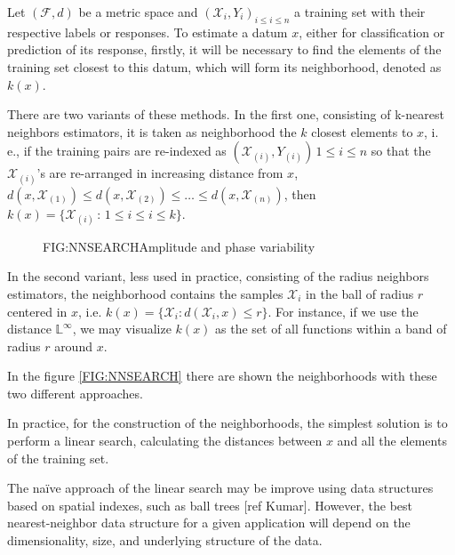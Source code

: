 
Let $(\mathcal{F}, d)$ be a metric space and
$(\mathcal{X}_i, {Y}_i)_{i \le i \le n}$ a training set with their
respective labels or responses.
To estimate a datum $x$, either for classification or prediction of its
response, firstly, it will be necessary to find the elements of the training set
closest to this datum, which will form its neighborhood, denoted as $k(x)$.

There are two variants of these methods. In the first one, consisting of
k-nearest neighbors estimators, it is taken as neighborhood the $k$ closest
elements to $x$, i. e., if the training pairs are re-indexed as
$(\mathcal{X}_{(i)}, Y_{(i)}) \, 1\le i\le n$ so that the
$\mathcal{X}_{(i)}$'s are re-arranged in increasing distance from $x$,
$d(x, \mathcal{X}_{(1)}) \le d(x, \mathcal{X}_{(2)}) \le \dots \le d(x, \mathcal{X}_{(n)})$,
 then $k(x) = \{\mathcal{X}_{(i)} \, : \, 1 \le i \le i\le k\}$.

\begin{figure}[neighborhoods using the distance $\mathbb{L}^\infty$]{FIG:NNSEARCH}{Amplitude and phase variability}
	 \quad
\end{figure}

In the second variant, less used in practice, consisting of the radius neighbors
estimators, the neighborhood contains the samples $\mathcal{X}_i$ in the ball of
radius $r$ centered in $x$, i.e.
$k(x) = \{ \mathcal{X}_i : d(\mathcal{X}_i , x) \le r\}$. For instance, if we
use the distance $\mathbb{L}^\infty$, we may visualize $k(x)$ as the set of all
functions within a band  of radius $r$ around $x$.

In the figure \ref{FIG:NNSEARCH} there are shown the neighborhoods with these two different
approaches.

In practice, for the construction of the neighborhoods, the simplest solution is
 to perform a linear search, calculating the distances between $x$ and all the
 elements of the training set.

The naïve approach of the linear search may be improve using data structures
based on spatial indexes, such as ball trees [ref Kumar]. However, the best
nearest-neighbor data structure for a given application will depend on the
dimensionality, size, and underlying structure of the data.
